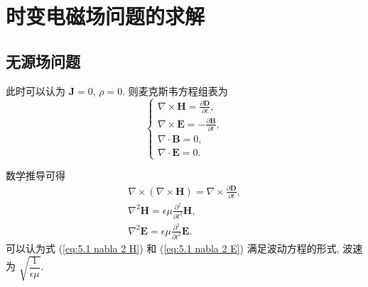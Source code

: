 \section{时变电磁场问题的求解}
\subsection{无源场问题}
此时可以认为 $\bm{J}=0$, $\rho=0$. 则麦克斯韦方程组表为
\begin{equation}
    \begin{cases}
        \nabla\times\bm{H}=\frac{\partial\bm{D}}{\partial t},  \\
        \nabla\times\bm{E}=-\frac{\partial\bm{B}}{\partial t}, \\
        \nabla\cdot\bm{B}=0,                                   \\
        \nabla\cdot\bm{E}=0.
    \end{cases}
\end{equation}

数学推导可得
\begin{gather}
    \nabla\times(\nabla\times\bm{H})=\nabla\times\frac{\partial\bm{D}}{\partial t}, \\
    \nabla^2\bm{H}=\epsilon\mu\frac{\partial^2}{\partial t^2}\bm{H}, \label{eq:5.1 nabla 2 H} \\
    \nabla^2\bm{E}=\epsilon\mu\frac{\partial^2}{\partial t^2}\bm{E}. \label{eq:5.1 nabla 2 E}
\end{gather}
可以认为式 (\ref{eq:5.1 nabla 2 H}) 和 (\ref{eq:5.1 nabla 2 E}) 满足波动方程的形式, 波速为 $\sqrt{\dfrac{1}{\epsilon\mu}}$.
